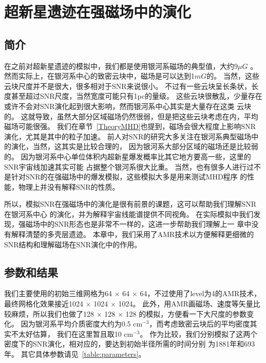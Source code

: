 \chapter{超新星遗迹在强磁场中的演化}
\label{Mag}

\section{简介}
\label{MagIntro}

在之前对超新星遗迹的模拟中，我们都是使用银河系磁场的典型值，大约9$\mu G$
\citep{Crutcher2012,Haverkorn2015}。
然而实际上，在银河系中心的致密云块中，磁场是可以达到1$mG$的\citep{Ferriere2009}。
当然，这些云块尺度并不是很大，很多相对于SNR来说很小。
不过有一些云块呈长条状，长度甚至超过SNR尺度，当然宽度可能只有1pc的量级。
这些云块很散乱，少量存在或许不会对SNR演化起到很大影响，然而银河系中心其实是大量存在这类
云块的。
这就导致，虽然大部分区域磁场仍然很弱，但是把这些云块考虑在内，平均磁场可能很强。
我们在章节~\ref{TheoryMHD}也提到，磁场会很大程度上影响SNR演化，尤其是其中的粒子加速。
前人对SNR的研究大多关注在银河系典型磁场中的演化，当然，这其实是比较合理的，
因为银河系大部分区域的磁场还是比较弱的。
因为银河系中心单位体积内超新星爆发概率比其它地方要高一些，这里的SNR宇宙线加速其实可能
占据整个银河系很大比重。
当然，也有很多人进行过不是针对SNR的在强磁场中的爆发模拟，这些模拟大多是用来测试MHD程序
的性能，物理上并没有解释SNR的性质\citep{Balsara1999, Stone2009, Barnes2018}。

所以，模拟SNR在强磁场中的演化是很有前景的课题，这可以帮助我们理解SNR在银河系中心
的演化，并为解释宇宙线能谱提供不同视角。
在实际模拟中我们发现，强磁场中的SNR形态也是非常不一样的，这进一步帮助我们理解上一
章中没有解释清楚的多壳层遗迹。
本章中，我们采用了AMR技术以方便解释更细微的SNR结构和理解磁场在SNR演化中的作用。

\section{参数和结果}
\label{MagMod}
我们主要使用的初始三维网格为64 $\times$ 64 $\times$ 64，不过使用了level为4的AMR技术，
最终网格化效果接近1024 $\times$ 1024 $\times$ 1024。
此外，用AMR画磁场、速度等矢量比较麻烦，所以我们也做了128 $\times$ 128 $\times$ 128
的模拟，方便看一下大尺度的参数变化。
因为银河系平均介质密度大约为0.5 cm$^{-3}$，而考虑致密云块后的平均密度其实不太好估算，
我们在这里暂且取10 cm$^{-3}$。
作为比较，我们分别模拟了这两个密度下的SNR演化，相对应的，要达到初始半径所需的时间分别
为1881年和693年。
其它具体参数请见~\ref{table:parameters}。

